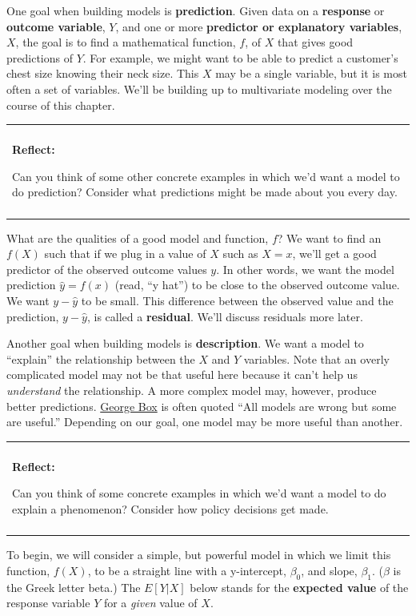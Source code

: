 \documentclass[
]{book}
\newenvironment{reflect}
{
    \begin{center}
    
    \begin{tabular}{|p{0.8\textwidth}|}
    \rowcolor{LightBlue}
    \hline\\
    \rowcolor{LightBlue}
    \textbf{Reflect:}
}
{
    \\\rowcolor{LightBlue}
    \\\hline
    \end{tabular} 
    \end{center}
}
\begin{document}
One goal when building models is \textbf{prediction}. Given data on a \textbf{response} or \textbf{outcome variable}, \(Y\), and one or more \textbf{predictor or explanatory variables}, \(X\), the goal is to find a mathematical function, \(f\), of \(X\) that gives good predictions of \(Y\). For example, we might want to be able to predict a customer's chest size knowing their neck size. This \(X\) may be a single variable, but it is most often a set of variables. We'll be building up to multivariate modeling over the course of this chapter.

\begin{reflect}
Can you think of some other concrete examples in which we'd want a model
to do prediction? Consider what predictions might be made about you
every day.
\end{reflect}

What are the qualities of a good model and function, \(f\)? We want to find an \(f(X)\) such that if we plug in a value of \(X\) such as \(X=x\), we'll get a good predictor of the observed outcome values \(y\). In other words, we want the model prediction \(\hat{y}=f(x)\) (read, ``y hat'') to be close to the observed outcome value. We want \(y-\hat{y}\) to be small. This difference between the observed value and the prediction, \(y-\hat{y}\), is called a \textbf{residual}. We'll discuss residuals more later.

Another goal when building models is \textbf{description}. We want a model to ``explain'' the relationship between the \(X\) and \(Y\) variables. Note that an overly complicated model may not be that useful here because it can't help us \emph{understand} the relationship. A more complex model may, however, produce better predictions. \href{https://en.wikipedia.org/wiki/George_E._P._Box}{George Box} is often quoted ``All models are wrong but some are useful.'' Depending on our goal, one model may be more useful than another.

\begin{reflect}
Can you think of some concrete examples in which we'd want a model to do
explain a phenomenon? Consider how policy decisions get made.
\end{reflect}

To begin, we will consider a simple, but powerful model in which we limit this function, \(f(X)\), to be a straight line with a y-intercept, \(\beta_0\), and slope, \(\beta_1\). (\(\beta\) is the Greek letter beta.) The \(E[Y | X]\) below stands for the \textbf{expected value} of the response variable \(Y\) for a \emph{given} value of \(X\).
\end{document}
